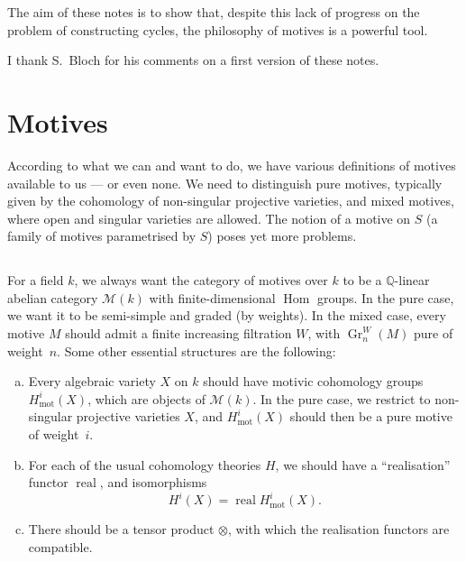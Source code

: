 \documentclass{article}
\theoremstyle{definition}
\newcommand{\sh}{\mathscr}
\newcommand{\QQ}{\mathbb{Q}}
\newcommand{\mot}{\mathrm{mot}}
\DeclareMathOperator{\Hom}{Hom}
\DeclareMathOperator{\real}{real}
\DeclareMathOperator{\Gr}{Gr}
\newcommand{\oldpage}[1]{\marginpar{\footnotesize$\Big\vert$ \textit{p.~#1}}}
\begin{document}
\oldpage{145}
The aim of these notes is to show that, despite this lack of progress on the problem of constructing cycles, the philosophy of motives is a powerful tool.

I thank S.~Bloch for his comments on a first version of these notes.


\section{Motives}
\label{1}

According to what we can and want to do, we have various definitions of motives available to us --- or even none.
We need to distinguish pure motives, typically given by the cohomology of non-singular projective varieties, and mixed motives, where open and singular varieties are allowed.
The notion of a motive on $S$ (a family of motives parametrised by $S$) poses yet more problems.

\subsection{}
\label{1.1}

For a field $k$, we always want the category of motives over $k$ to be a $\QQ$-linear abelian category $\sh{M}(k)$ with finite-dimensional $\Hom$ groups.
In the pure case, we want it to be semi-simple and graded (by weights).
In the mixed case, every motive $M$ should admit a finite increasing filtration $W$, with $\Gr_n^W(M)$ pure of weight~$n$.
Some other essential structures are the following:
\begin{enumerate}[(a)]
  \item Every algebraic variety $X$ on $k$ should have motivic cohomology groups $H_\mot^i(X)$, which are objects of $\sh{M}(k)$.
    In the pure case, we restrict to non-singular projective varieties $X$, and $H_\mot^i(X)$ should then be a pure motive of weight~$i$.
  \item For each of the usual cohomology theories $H$, we should have a ``realisation'' functor $\real$, and isomorphisms
    \[
      H^i(X) = \real H_\mot^i(X).
    \]
  \item There should be a tensor product $\otimes$, with which the realisation functors are compatible.
\end{enumerate}

\subsection{}
\label{1.2}
\end{document}
